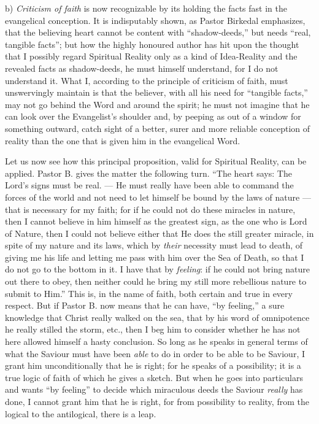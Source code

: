 \documentclass[12pt,a4paper,openany]{book}
\newcommand{\opage}[1]{\marginnote{\footnotesize\textit{[#1]}}}
\begin{document}
b) \emph{Criticism of faith} is now recognizable by its holding
the facts fast in the evangelical conception.
It is indisputably shown, as Pastor Birkedal emphasizes,
that the believing heart cannot be content with ``shadow-deeds,''
but needs ``real, tangible facts'';
but how the highly honoured author has hit
upon the thought that I possibly regard Spiritual Reality only
as a kind of Idea-Reality and the revealed facts
as shadow-deeds, he must himself understand,
for I do not understand it. What I, according to the principle of
criticism of faith, must unswervingly maintain is that the believer, with
all his need for ``tangible facts,'' may not
go behind the Word and around the spirit; he must
not imagine that he can look over the Evangelist's
shoulder and, by peeping as out of a window for something
outward, catch sight of a better, surer and more reliable
conception of reality than the one that is given him in
the evangelical Word.

Let us now see how this principal proposition, valid for Spiritual Reality,
can be applied. Pastor B.
gives the matter the following turn. ``The heart says: The Lord's
signs must be real. --- He must really have
been able to command the forces of the world and not need to
let himself be bound by the laws of nature --- that is necessary for
my faith; for if he could not do these miracles in nature,
then I cannot believe in him himself as the greatest
sign, as the one who is Lord of Nature, then I could
\setcounter{footnote}{0}%
\opage{23}not believe either that He does the still greater miracle,
in spite of my nature and its laws, which by \emph{their}
necessity must lead to death, of giving me his
life and letting me pass with him over the Sea of Death, so that I
do not go to the bottom in it. I have that by \emph{feeling}:
if he could not bring nature out there to obey,
then neither could he bring my still more rebellious
nature to submit to Him.'' This is, in the
name of faith, both certain and true in every respect. But
if Pastor B. now means that he can have, ``by feeling,''
a sure knowledge that Christ really walked
on the sea, that by his word of omnipotence he really stilled
the storm, etc., then I beg him to consider whether
he has not here allowed himself a hasty conclusion. So long
as he speaks in general terms of what the Saviour must
have been \emph{able} to do in order to be able to be Saviour, I grant him
unconditionally that he is right; for he speaks of a possibility; it is
a true logic of faith of which he gives a sketch. But
when he goes into particulars and wants ``by feeling'' to decide
which miraculous deeds the Saviour \emph{really} has done,
I cannot grant him that he is right, for from possibility to reality,
from the logical to the antilogical, there is a
leap.
\end{document}
